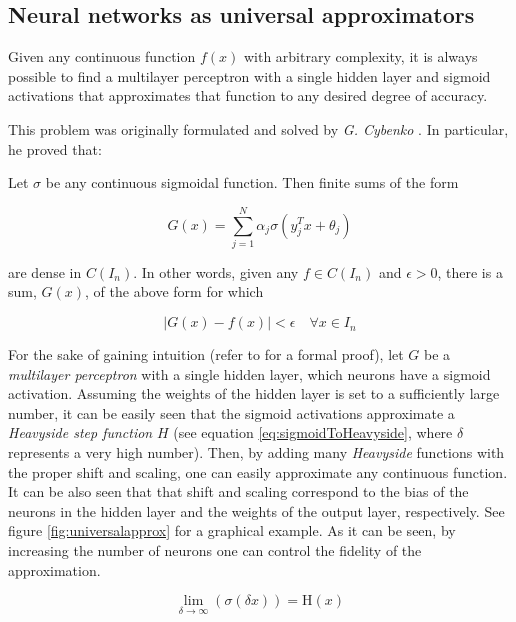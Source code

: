 \subsection{Neural networks as universal approximators}
Given any continuous function $f(x)$ with arbitrary complexity, it is always possible to find a multilayer perceptron with a single hidden layer and sigmoid activations that approximates that function to any desired degree of accuracy.

This problem was originally formulated and solved by \textit{G. Cybenko} \autocite{Cybenko1989}. In particular, he proved that:

\begin{thm}[ 2 - Cybenko, 1989]
	Let $\sigma$ be any continuous sigmoidal function. Then finite sums of the form

	$$ G(x) = \sum_{j=1}^{N} \alpha_j \sigma(y_j^Tx + \theta_j) $$

	are dense in $C(I_n)$. In other words, given any $f \in C(I_n)$ and $\epsilon > 0$, there is a sum, $G(x)$, of the above form for which

	$$|G(x) - f(x)| < \epsilon \quad \forall x \in I_n$$
\end{thm}

For the sake of gaining intuition (refer to \autocite{Cybenko1989} for a formal proof), let $G$ be a \textit{multilayer perceptron} with a single hidden layer, which neurons have a sigmoid activation. Assuming the weights of the hidden layer is set to a sufficiently large number, it can be easily seen that the sigmoid activations approximate a \textit{Heavyside step function} $H$ (see equation \ref{eq:sigmoidToHeavyside}, where $\delta$ represents a very high number). Then, by adding many \textit{Heavyside} functions with the proper shift and scaling, one can easily approximate any continuous function. It can be also seen that that shift and scaling correspond to the bias of the neurons in the hidden layer and the weights of the output layer, respectively. See figure \ref{fig:universalapprox} for a graphical example. As it can be seen, by increasing the number of neurons one can control the fidelity of the approximation.


\begin{equation}
	\label{eq:sigmoidToHeavyside}
	\lim_{\delta \rightarrow \infty} (\sigma(\delta x)) = \mathrm{H}(x)
\end{equation}

